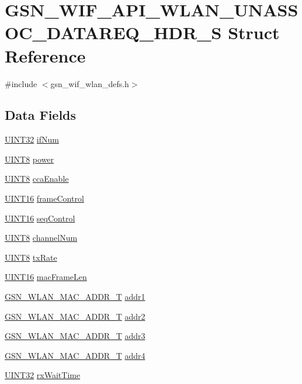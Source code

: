\hypertarget{a00314}{
\section{GSN\_\-WIF\_\-API\_\-WLAN\_\-UNASSOC\_\-DATAREQ\_\-HDR\_\-S Struct Reference}
\label{a00314}
}


{\ttfamily \#include $<$gsn\_\-wif\_\-wlan\_\-defs.h$>$}

\subsection*{Data Fields}
\begin{DoxyCompactItemize}
\item 
\hyperlink{a00660_gae1e6edbbc26d6fbc71a90190d0266018}{UINT32} \hyperlink{a00314_ab582fd779b13f74e06e2491389a60aa0}{ifNum}
\item 
\hyperlink{a00660_gab27e9918b538ce9d8ca692479b375b6a}{UINT8} \hyperlink{a00314_a4c8eb0ca371827e10c536db866688f52}{power}
\item 
\hyperlink{a00660_gab27e9918b538ce9d8ca692479b375b6a}{UINT8} \hyperlink{a00314_af29c8bdba388da0d4feb53a6e93267c0}{ccaEnable}
\item 
\hyperlink{a00660_ga09f1a1fb2293e33483cc8d44aefb1eb1}{UINT16} \hyperlink{a00314_aae37483e13565a182a35f1007ed80b67}{frameControl}
\item 
\hyperlink{a00660_ga09f1a1fb2293e33483cc8d44aefb1eb1}{UINT16} \hyperlink{a00314_aaa8b67573a2ca92fa28a335243b69a86}{seqControl}
\item 
\hyperlink{a00660_gab27e9918b538ce9d8ca692479b375b6a}{UINT8} \hyperlink{a00314_a6a6d4d9a86f4af6b162dab11e712c9d4}{channelNum}
\item 
\hyperlink{a00660_gab27e9918b538ce9d8ca692479b375b6a}{UINT8} \hyperlink{a00314_ab1ab70812caf37881581c451398a6f9c}{txRate}
\item 
\hyperlink{a00660_ga09f1a1fb2293e33483cc8d44aefb1eb1}{UINT16} \hyperlink{a00314_ac3acb956519f881e356ab23af1a6aa07}{macFrameLen}
\item 
\hyperlink{a00416}{GSN\_\-WLAN\_\-MAC\_\-ADDR\_\-T} \hyperlink{a00314_a17a45e92bc4a3c2c64f2430436ec2f2d}{addr1}
\item 
\hyperlink{a00416}{GSN\_\-WLAN\_\-MAC\_\-ADDR\_\-T} \hyperlink{a00314_a6b09d240f1a39f76b56ad4e28e6a88cc}{addr2}
\item 
\hyperlink{a00416}{GSN\_\-WLAN\_\-MAC\_\-ADDR\_\-T} \hyperlink{a00314_a10c176e5ced570a3ddc47fb5db319e4f}{addr3}
\item 
\hyperlink{a00416}{GSN\_\-WLAN\_\-MAC\_\-ADDR\_\-T} \hyperlink{a00314_a86e277d54defc9c626b1e70224c2b797}{addr4}
\item 
\hyperlink{a00660_gae1e6edbbc26d6fbc71a90190d0266018}{UINT32} \hyperlink{a00314_a5e99b08f817fc8c7382a7f48f61a44bb}{rxWaitTime}
\end{DoxyCompactItemize}


